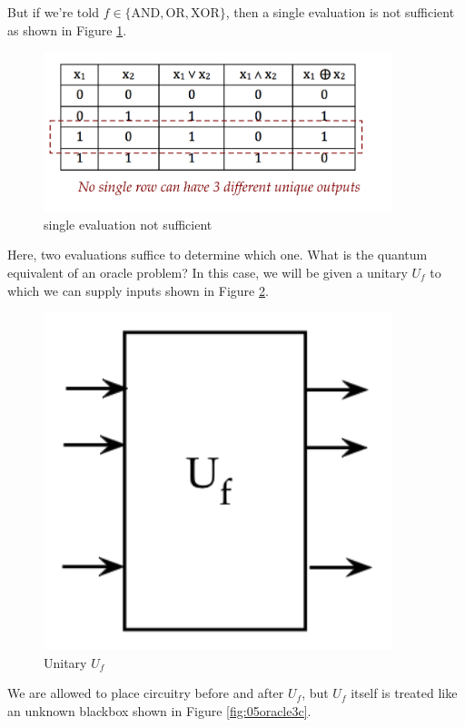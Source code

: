 \documentclass[main.tex]{subfiles}
\begin{document}
    But if we're told $f \in\{\mathrm{AND}, \mathrm{OR}, \mathrm{XOR}\}$, then a single evaluation is not sufficient as shown in Figure \ref{fig:03oracle3}.
    
    \begin{figure}
        \centering
        \includegraphics[width=4in]{notes/figs/n11/03oracle3.png}
        \caption{single evaluation not sufficient }
        \label{fig:03oracle3}
    \end{figure}
    
    Here, two evaluations suffice to determine which one. What is the quantum equivalent of an oracle problem? In this case, we will be given a unitary $U_{f}$ to which we can supply inputs shown in Figure \ref{fig:04oracle3b}.
    
    \begin{figure}
        \centering
        \includegraphics[width=4in]{notes/figs/n11/04oracle3b.png}
        \caption{Unitary $U_{f}$}
        \label{fig:04oracle3b}
    \end{figure}
    
    We are allowed to place circuitry before and after $U_{f}$, but $U_{f}$ itself is treated like an unknown blackbox shown in Figure \ref{fig:05oracle3c}.
    
\end{document}
